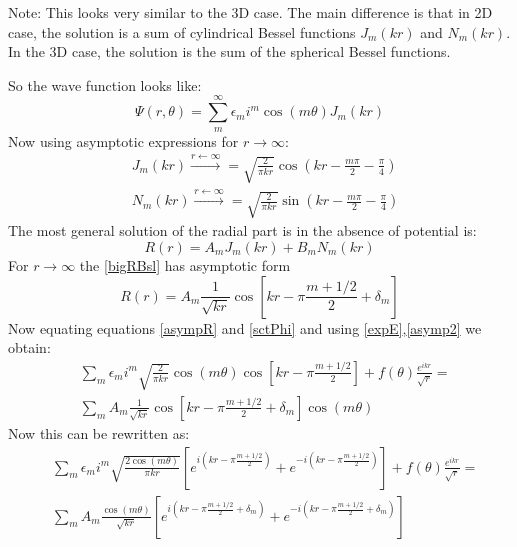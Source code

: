 Note: This looks very similar to the 3D case. The main difference is that in 2D case, the solution is a sum of cylindrical Bessel functions $ J_m(kr) $ and $ N_m(kr) $.
In the 3D case, the solution is the sum of the spherical Bessel functions.

So the wave function looks like:
\begin{equation}
 \Psi(r,\theta) = \sum_m^{\infty}{\epsilon_m i^m \cos(m\theta)J_m(kr)}
\end{equation}
Now using asymptotic expressions for $ r \rightarrow \infty $:
\begin{equation}\label{}
\begin{split}
& J_m(kr) \xrightarrow{r \leftarrow \infty}  = \sqrt{\frac{2}{\pi k r}}\cos\left(kr - \frac{m\pi}{2} - \frac{\pi}{4}\right) \\[.7em]
& N_m(kr) \xrightarrow{r \leftarrow \infty}  = \sqrt{\frac{2}{\pi k r}}\sin\left(kr - \frac{m\pi}{2} - \frac{\pi}{4}\right)
\end{split}
\end{equation}
The most general solution of the radial part is in the absence of potential is:
\begin{equation}\label{bigRBsl}
R(r) = A_mJ_m(kr) + B_mN_m(kr) 
\end{equation}
For $ r \rightarrow\infty $ the \eqref{bigRBsl} has asymptotic form
\begin{equation}\label{asympR}
R(r) = A_m\frac{1}{\sqrt{kr}}\cos\left[kr-\pi\frac{m + 1/2}{2} + \delta_m\right]
\end{equation}
Now equating equations \eqref{asympR} and \eqref{sctPhi} and using \eqref{expE},\eqref{asymp2} we obtain:
\begin{equation}\label{asymR2}
\begin{split}
& \sum_m{\epsilon_m i^m\sqrt{\frac{2}{\pi kr}}\cos(m\theta)\cos\left[kr-\pi\frac{m + 1/2}{2}\right]} + f(\theta)\frac{e^{ikr}}{\sqrt{r}} = \\[.7em]
& \sum_m{A_m\frac{1}{\sqrt{kr}}\cos\left[kr-\pi\frac{m + 1/2}{2} + \delta_m\right]\cos(m\theta)}
\end{split}
\end{equation}
Now this can be rewritten as:
\begin{equation}\label{asyR3}
\begin{split}
& \sum_m{\epsilon_m i^m \sqrt{\frac{2\cos(m\theta)}{\pi kr}}\left[e^{i\left(kr-\pi\frac{m + 1/2}{2}\right)} + e^{-i\left(kr-\pi\frac{m + 1/2}{2}\right)}\right]}
+ f(\theta)\frac{e^{ikr}}{\sqrt{r}} = \\[.7em]
& \sum_m{A_m\frac{\cos(m\theta)}{\sqrt{kr}}\left[e^{i\left(kr-\pi\frac{m + 1/2}{2} + \delta_m\right)} + e^{-i\left(kr-\pi\frac{m + 1/2}{2} + \delta_m\right)}\right]}
\end{split}
\end{equation}
